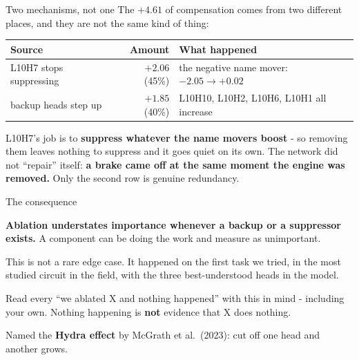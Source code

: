 \documentclass[aspectratio=169]{beamer}
\newcommand{\keybox}[1]{%
  \begin{tcolorbox}[colback=armblue!8, colframe=armblue, boxrule=0.6pt, arc=2pt]
  #1
  \end{tcolorbox}}
\newcommand{\trapbox}[1]{%
  \begin{tcolorbox}[colback=armred!8, colframe=armred, boxrule=0.6pt, arc=2pt]
  #1
  \end{tcolorbox}}
\begin{document}
\begin{frame}{Two mechanisms, not one}
  \vspace{0.5em}
  The $+4.61$ of compensation comes from two different places, and they are not the same kind of
  thing:

  \vspace{0.6em}
  \begin{center}
  \small
  \begin{tabular}{@{}p{}rp{}@{}}
    \toprule
    \textbf{Source} & \textbf{Amount} & \textbf{What happened}\\
    \midrule
    \textcolor{armred}{L10H7 stops suppressing} & $+2.06$ (45\%) &
      the negative name mover: $-2.05 \rightarrow +0.02$\\[0.5em]
    \textcolor{paramgreen}{backup heads step up} & $+1.85$ (40\%) &
      L10H10, L10H2, L10H6, L10H1 all increase\\
    \bottomrule
  \end{tabular}
  \end{center}

  \vspace{0.5em}
  \keybox{\small L10H7's job is to \textbf{suppress whatever the name movers boost} - so removing
  them leaves nothing to suppress and it goes quiet on its own. The network did not ``repair''
  itself: \textbf{a brake came off at the same moment the engine was removed.} Only the second
  row is genuine redundancy.}
\end{frame}

\begin{frame}{The consequence}
  \vspace{1.0em}
  \trapbox{\textbf{Ablation understates importance whenever a backup or a suppressor exists.} A
  component can be doing the work and measure as unimportant.}

  \vspace{1.0em}
  This is not a rare edge case. It happened on the first task we tried, in the most studied
  circuit in the field, with the three best-understood heads in the model.

  \vspace{1.0em}
  \keybox{Read every ``we ablated X and nothing happened'' with this in mind - including your
  own. Nothing happening is \textbf{not} evidence that X does nothing.}

  \vspace{0.6em}
  {\footnotesize Named the \textbf{Hydra effect} by McGrath et al.\ (2023): cut off one head and
  another grows.}
\end{frame}
\end{document}
